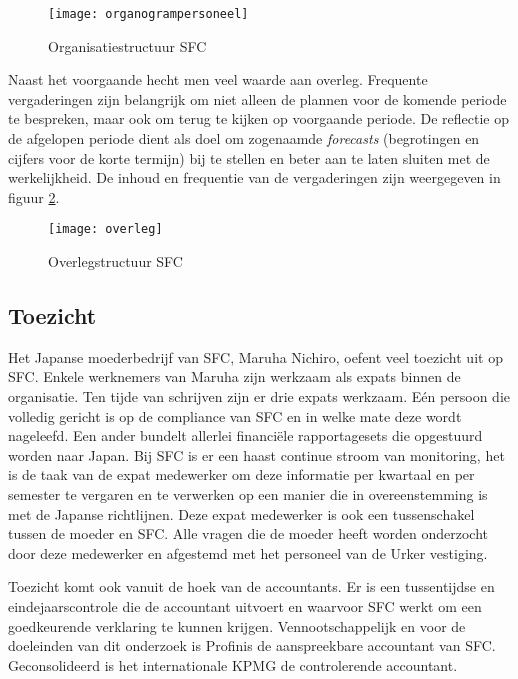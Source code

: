 \begin{figure}[!h]
    \centering
    \texttt{[image: organogrampersoneel]}
    \caption{Organisatiestructuur SFC \citep{aoibsfc}}
    \label{fig:organogrampers}
\end{figure}

Naast het voorgaande hecht men veel waarde aan overleg. Frequente vergaderingen zijn belangrijk om niet alleen de plannen voor de komende periode te bespreken, maar ook om terug te kijken op voorgaande periode. De reflectie op de afgelopen periode dient als doel om zogenaamde \textit{forecasts} (begrotingen en cijfers voor de korte termijn) bij te stellen en beter aan te laten sluiten met de werkelijkheid. De inhoud en frequentie van de vergaderingen zijn weergegeven in figuur \ref{fig:overleg}.

\begin{figure}[!h]
    \centering
    \texttt{[image: overleg]}
    \caption{Overlegstructuur SFC \citep{aoibsfc}}
    \label{fig:overleg}
\end{figure}

\newpage
\subsection{Toezicht}
Het Japanse moederbedrijf van SFC, Maruha Nichiro, oefent veel toezicht uit op SFC. Enkele werknemers van Maruha zijn werkzaam als expats binnen de organisatie. Ten tijde van schrijven zijn er drie expats werkzaam. Eén persoon die volledig gericht is op de compliance van SFC en in welke mate deze wordt nageleefd. Een ander bundelt allerlei financiële rapportagesets die opgestuurd worden naar Japan. Bij SFC is er een haast continue stroom van monitoring, het is de taak van de expat medewerker om deze informatie per kwartaal en per semester te vergaren en te verwerken op een manier die in overeenstemming is met de Japanse richtlijnen. Deze expat medewerker is ook een tussenschakel tussen de moeder en SFC. Alle vragen die de moeder heeft worden onderzocht door deze medewerker en afgestemd met het personeel van de Urker vestiging. \citep{aoibsfc}

Toezicht komt ook vanuit de hoek van de accountants. Er is een tussentijdse en eindejaarscontrole die de accountant uitvoert en waarvoor SFC werkt om een goedkeurende verklaring te kunnen krijgen. Vennootschappelijk en voor de doeleinden van dit onderzoek is Profinis de aanspreekbare accountant van SFC. Geconsolideerd is het internationale KPMG de controlerende accountant. \citep{quickscan}

